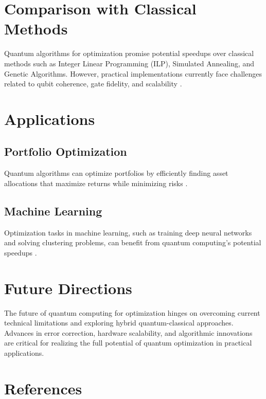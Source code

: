 \documentclass[12pt]{article}
\begin{document}
\section{Comparison with Classical Methods}
Quantum algorithms for optimization promise potential speedups over classical methods such as Integer Linear Programming (ILP), Simulated Annealing, and Genetic Algorithms. However, practical implementations currently face challenges related to qubit coherence, gate fidelity, and scalability \citep{glover2019quantum, lucas2014ising}.

\section{Applications}
\subsection{Portfolio Optimization}
Quantum algorithms can optimize portfolios by efficiently finding asset allocations that maximize returns while minimizing risks \citep{rebentrost2018quantum}.

\subsection{Machine Learning}
Optimization tasks in machine learning, such as training deep neural networks and solving clustering problems, can benefit from quantum computing's potential speedups \citep{biamonte2017quantum, wiebe2014quantum}.

\section{Future Directions}
The future of quantum computing for optimization hinges on overcoming current technical limitations and exploring hybrid quantum-classical approaches. Advances in error correction, hardware scalability, and algorithmic innovations are critical for realizing the full potential of quantum optimization in practical applications.

\section*{References}


\end{document}
